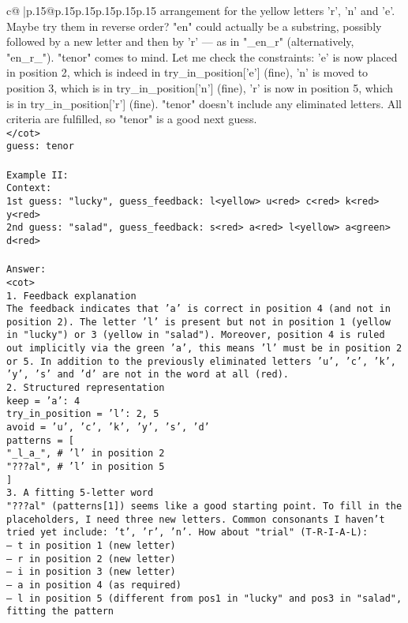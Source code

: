 \documentclass{article}
\begin{document}
{\begin{supertabular}{c@{$\;$}|p{.15\linewidth}@{}p{.15\linewidth}p{.15\linewidth}p{.15\linewidth}p{.15\linewidth}p{.15\linewidth}}
{{{arrangement for the yellow letters 'r', 'n' and 'e'. Maybe try them in reverse order? "en" could actually be a substring, possibly followed by a new letter and then by 'r' — as in "_en_r" (alternatively, "en_r_"). "tenor" comes to mind. Let me check the constraints: 'e' is now placed in position 2, which is indeed in try_in_position['e'] (fine), 'n' is moved to position 3, which is in try_in_position['n'] (fine), 'r' is now in position 5, which is in try_in_position['r'] (fine). "tenor" doesn't include any eliminated letters. All criteria are fulfilled, so "tenor" is a good next guess.\\ \tt </cot>\\ \tt guess: tenor\\ \tt \\ \tt Example II:\\ \tt Context:\\ \tt 1st guess: "lucky", guess_feedback: l<yellow> u<red> c<red> k<red> y<red>\\ \tt 2nd guess: "salad", guess_feedback: s<red> a<red> l<yellow> a<green> d<red>\\ \tt \\ \tt Answer:\\ \tt <cot>\\ \tt 1. Feedback explanation\\ \tt The feedback indicates that 'a' is correct in position 4 (and not in position 2). The letter 'l' is present but not in position 1 (yellow in "lucky") or 3 (yellow in "salad"). Moreover, position 4 is ruled out implicitly via the green 'a', this means 'l' must be in position 2 or 5. In addition to the previously eliminated letters {'u', 'c', 'k', 'y'}, 's' and 'd' are not in the word at all (red).\\ \tt 2. Structured representation\\ \tt keep = {'a': 4}\\ \tt try_in_position = {'l': {2, 5}}\\ \tt avoid = {'u', 'c', 'k', 'y', 's', 'd'}\\ \tt patterns = [\\ \tt     "_l_a_",  # 'l' in position 2\\ \tt     "???al",  # 'l' in position 5\\ \tt ]\\ \tt 3. A fitting 5-letter word\\ \tt "???al" (patterns[1]) seems like a good starting point. To fill in the placeholders, I need three new letters. Common consonants I haven't tried yet include: 't', 'r', 'n'. How about "trial" (T-R-I-A-L):\\ \tt — t in position 1 (new letter)\\ \tt — r in position 2 (new letter)\\ \tt — i in position 3 (new letter)\\ \tt — a in position 4 (as required)\\ \tt — l in position 5 (different from pos1 in "lucky" and pos3 in "salad", fitting the pattern }}}
\end{supertabular}}
\end{document}
